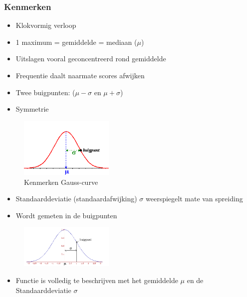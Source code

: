 \documentclass{article}
\begin{document}
\subsubsection{Kenmerken}

\begin{itemize}
    \item Klokvormig verloop
    \item 1 maximum = gemiddelde = mediaan ($\mu$)
    \item Uitslagen vooral geconcentreerd rond gemiddelde
    \item Frequentie daalt naarmate scores afwijken
    \item Twee buigpunten: ($\mu - \sigma$ en $\mu + \sigma$)
    \item Symmetrie
\end{itemize}

\begin{figure}[H]
    \centering
    \includegraphics[width=0.4\textwidth]{gauss-kenmerken.png}
    \caption{Kenmerken Gauss-curve}
\end{figure}

\begin{itemize}
    \item Standaarddeviatie (standaardafwijking) $\sigma$ weerspiegelt mate van spreiding
    \item Wordt gemeten in de buigpunten
\end{itemize}

\begin{figure}[H]
    \centering
    \includegraphics[width=0.4\textwidth]{gauss-buigpunt.png}
\end{figure}

\begin{itemize}
    \item Functie is volledig te beschrijven met het gemiddelde $\mu$ en de Standaarddeviatie $\sigma$
\end{itemize}
\end{document}
